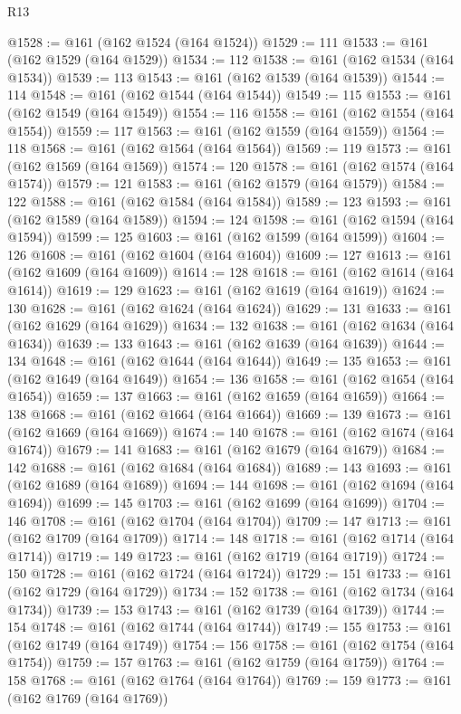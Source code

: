 \begin{lexlean}{R13}
\begin{coremodule}
{{{{{{{{{{{{{{{{{{{{{{{{{{{{{{{{{{{{{{{{{{{{{{{{{{{{{{{{{{{{{{{{{{{{{{{{{{{{{{{{{{{{{{{{{{{{{{{{{{{{{{{{{{@1528 := @161 (@162 @1524 (@164 @1524))
@1529 := 111
@1533 := @161 (@162 @1529 (@164 @1529))
@1534 := 112
@1538 := @161 (@162 @1534 (@164 @1534))
@1539 := 113
@1543 := @161 (@162 @1539 (@164 @1539))
@1544 := 114
@1548 := @161 (@162 @1544 (@164 @1544))
@1549 := 115
@1553 := @161 (@162 @1549 (@164 @1549))
@1554 := 116
@1558 := @161 (@162 @1554 (@164 @1554))
@1559 := 117
@1563 := @161 (@162 @1559 (@164 @1559))
@1564 := 118
@1568 := @161 (@162 @1564 (@164 @1564))
@1569 := 119
@1573 := @161 (@162 @1569 (@164 @1569))
@1574 := 120
@1578 := @161 (@162 @1574 (@164 @1574))
@1579 := 121
@1583 := @161 (@162 @1579 (@164 @1579))
@1584 := 122
@1588 := @161 (@162 @1584 (@164 @1584))
@1589 := 123
@1593 := @161 (@162 @1589 (@164 @1589))
@1594 := 124
@1598 := @161 (@162 @1594 (@164 @1594))
@1599 := 125
@1603 := @161 (@162 @1599 (@164 @1599))
@1604 := 126
@1608 := @161 (@162 @1604 (@164 @1604))
@1609 := 127
@1613 := @161 (@162 @1609 (@164 @1609))
@1614 := 128
@1618 := @161 (@162 @1614 (@164 @1614))
@1619 := 129
@1623 := @161 (@162 @1619 (@164 @1619))
@1624 := 130
@1628 := @161 (@162 @1624 (@164 @1624))
@1629 := 131
@1633 := @161 (@162 @1629 (@164 @1629))
@1634 := 132
@1638 := @161 (@162 @1634 (@164 @1634))
@1639 := 133
@1643 := @161 (@162 @1639 (@164 @1639))
@1644 := 134
@1648 := @161 (@162 @1644 (@164 @1644))
@1649 := 135
@1653 := @161 (@162 @1649 (@164 @1649))
@1654 := 136
@1658 := @161 (@162 @1654 (@164 @1654))
@1659 := 137
@1663 := @161 (@162 @1659 (@164 @1659))
@1664 := 138
@1668 := @161 (@162 @1664 (@164 @1664))
@1669 := 139
@1673 := @161 (@162 @1669 (@164 @1669))
@1674 := 140
@1678 := @161 (@162 @1674 (@164 @1674))
@1679 := 141
@1683 := @161 (@162 @1679 (@164 @1679))
@1684 := 142
@1688 := @161 (@162 @1684 (@164 @1684))
@1689 := 143
@1693 := @161 (@162 @1689 (@164 @1689))
@1694 := 144
@1698 := @161 (@162 @1694 (@164 @1694))
@1699 := 145
@1703 := @161 (@162 @1699 (@164 @1699))
@1704 := 146
@1708 := @161 (@162 @1704 (@164 @1704))
@1709 := 147
@1713 := @161 (@162 @1709 (@164 @1709))
@1714 := 148
@1718 := @161 (@162 @1714 (@164 @1714))
@1719 := 149
@1723 := @161 (@162 @1719 (@164 @1719))
@1724 := 150
@1728 := @161 (@162 @1724 (@164 @1724))
@1729 := 151
@1733 := @161 (@162 @1729 (@164 @1729))
@1734 := 152
@1738 := @161 (@162 @1734 (@164 @1734))
@1739 := 153
@1743 := @161 (@162 @1739 (@164 @1739))
@1744 := 154
@1748 := @161 (@162 @1744 (@164 @1744))
@1749 := 155
@1753 := @161 (@162 @1749 (@164 @1749))
@1754 := 156
@1758 := @161 (@162 @1754 (@164 @1754))
@1759 := 157
@1763 := @161 (@162 @1759 (@164 @1759))
@1764 := 158
@1768 := @161 (@162 @1764 (@164 @1764))
@1769 := 159
@1773 := @161 (@162 @1769 (@164 @1769))
}}}}}}}}}}}}}}}}}}}}}}}}}}}}}}}}}}}}}}}}}}}}}}}}}}}}}}}}}}}}}}}}}}}}}}}}}}}}}}}}}}}}}}}}}}}}}}}}}}}}}}}}}}
\end{coremodule}
\end{lexlean}
